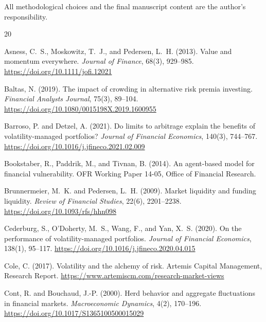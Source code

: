 \documentclass[12pt,a4paper]{article}
\begin{document}
All methodological choices and the final manuscript content are the author's responsibility.



\begin{thebibliography}{20}

Asness, C.~S., Moskowitz, T.~J., and Pedersen, L.~H. (2013).
\newblock Value and momentum everywhere.
\newblock \emph{Journal of Finance}, 68(3), 929--985.
\newblock \url{https://doi.org/10.1111/jofi.12021}

Baltas, N. (2019).
\newblock The impact of crowding in alternative risk premia investing.
\newblock \emph{Financial Analysts Journal}, 75(3), 89--104.
\newblock \url{https://doi.org/10.1080/0015198X.2019.1600955}

Barroso, P. and Detzel, A. (2021).
\newblock Do limits to arbitrage explain the benefits of volatility-managed portfolios?
\newblock \emph{Journal of Financial Economics}, 140(3), 744--767.
\newblock \url{https://doi.org/10.1016/j.jfineco.2021.02.009}

Bookstaber, R., Paddrik, M., and Tivnan, B. (2014).
\newblock An agent-based model for financial vulnerability.
\newblock OFR Working Paper 14-05, Office of Financial Research.

Brunnermeier, M.~K. and Pedersen, L.~H. (2009).
\newblock Market liquidity and funding liquidity.
\newblock \emph{Review of Financial Studies}, 22(6), 2201--2238.
\newblock \url{https://doi.org/10.1093/rfs/hhn098}

Cederburg, S., O'Doherty, M.~S., Wang, F., and Yan, X.~S. (2020).
\newblock On the performance of volatility-managed portfolios.
\newblock \emph{Journal of Financial Economics}, 138(1), 95--117.
\newblock \url{https://doi.org/10.1016/j.jfineco.2020.04.015}

Cole, C. (2017).
\newblock Volatility and the alchemy of risk.
\newblock Artemis Capital Management, Research Report.
\newblock \url{https://www.artemiscm.com/research-market-views}

Cont, R. and Bouchaud, J.-P. (2000).
\newblock Herd behavior and aggregate fluctuations in financial markets.
\newblock \emph{Macroeconomic Dynamics}, 4(2), 170--196.
\newblock \url{https://doi.org/10.1017/S1365100500015029}


\end{thebibliography}
\end{document}
